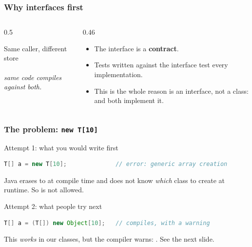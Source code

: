 \documentclass[aspectratio=169,10pt,compress]{beamer}
\begin{document}
\begin{frame}[t,fragile] \frametitle{Why interfaces first}
  \begin{columns}[T]
    \begin{column}{0.5\textwidth}
      \begin{block}{Same caller, different store}
        \small
        \\
        \\
        \emph{same  code compiles against both.}
      \end{block}
    \end{column}
    \begin{column}{0.46\textwidth}
      \begin{itemize}\small
        \item The interface is a \textbf{contract}.
        \item Tests written against the interface test every implementation.
        \item This is the whole reason  is an interface,
              not a class:  and  both
              implement it.
      \end{itemize}
    \end{column}
  \end{columns}
\end{frame}





\begin{frame}[t,fragile] \frametitle{The problem: \texttt{new T[10]}}
  \begin{block}{Attempt 1: what you would write first}
    \begin{lstlisting}[language=Java, basicstyle=\ttfamily\scriptsize, frame=single]
T[] a = new T[10];              // error: generic array creation
    \end{lstlisting}
  \end{block}
  \small
  Java erases  to  at compile time and does not
  know \emph{which} class to create at runtime. So 
  is not allowed.

  \begin{block}{Attempt 2: what people try next}
    \begin{lstlisting}[language=Java, basicstyle=\ttfamily\scriptsize, frame=single]
T[] a = (T[]) new Object[10];   // compiles, with a warning
    \end{lstlisting}
  \end{block}
  \small
  This \emph{works} in our classes, but the compiler warns:
  . See the next slide.
\end{frame}
\end{document}
